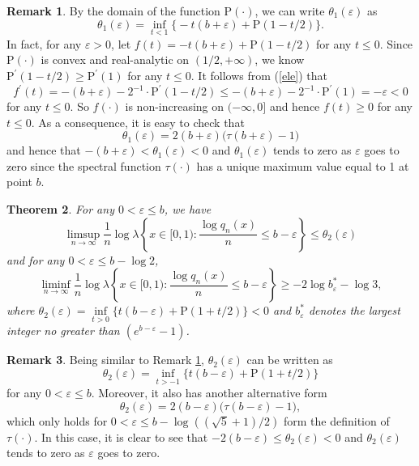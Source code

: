 \documentclass[reqno]{amsart}
\newtheorem{theorem}{Theorem}[section]
\theoremstyle{definition}
\newtheorem{remark}[theorem]{Remark}
\numberwithin{equation}{section}
\begin{document}
\begin{remark}\label{1}
By the domain of the function $\mathrm{P (\cdot)}$, we can write $\theta_1(\varepsilon)$ as
\[
\theta_1(\varepsilon) = \inf\limits_{t < 1} \big\{-t(b + \varepsilon) + \mathrm{P}(1-t/2)\big\}.
\]
In fact, for any $\varepsilon >0$, let $f(t) = -t(b + \varepsilon) + \mathrm{P}(1-t/2)$ for any $t \leq 0$. Since $\mathrm{P(\cdot)}$ is convex and real-analytic on $(1/2,+\infty)$, we know $\mathrm{P}^\prime(1-t/2) \geq \mathrm{P}^\prime(1)$ for any $t \leq 0$. It follows from (\ref{ele}) that
\[
f^\prime(t) = -(b+\varepsilon) -2^{-1}\cdot \mathrm{P}^\prime(1-t/2) \leq -(b+\varepsilon) -2^{-1}\cdot \mathrm{P}^\prime(1) = -\varepsilon <0
\]
for any $t \leq 0$. So $f(\cdot)$ is non-increasing on $(-\infty,0]$ and hence $f(t) \geq 0$ for any $t \leq 0$. As a consequence, it is easy to check that
\[
\theta_1(\varepsilon) = 2(b+\varepsilon)\big(\tau(b+\varepsilon)-1\big)
\]
and hence that $-(b+\varepsilon) < \theta_1(\varepsilon)<0$ and $\theta_1(\varepsilon)$ tends to zero as $\varepsilon$ goes to zero since the spectral function $\tau(\cdot)$ has a unique maximum value equal to 1 at point $b$.
\end{remark}

\begin{theorem}\label{xiaoyu}
For any $0< \varepsilon \leq b$, we have
\begin{equation*}
\limsup_{n \to \infty} \frac{1}{n}\log \lambda\left\{x\in [0,1):\frac{\log q_n(x)}{n} \leq b -\varepsilon\right\} \leq \theta_2(\varepsilon)
\end{equation*}
and for any $0< \varepsilon \leq b - \log 2$,
\begin{equation*}
\liminf_{n \to \infty} \frac{1}{n}\log \lambda\left\{x\in [0,1):\frac{\log q_n(x)}{n} \leq b -\varepsilon\right\} \geq -2\log b^{\ast}_\varepsilon - \log 3,
\end{equation*}
where $\theta_2(\varepsilon) = \inf\limits_{t> 0} \big\{t(b - \varepsilon) + \mathrm{P}(1+t/2)\big\}< 0$ and $b^{\ast}_\varepsilon$ denotes the largest integer no greater than $(e^{b-\varepsilon}-1)$.
\end{theorem}

\begin{remark}\label{2}
Being similar to Remark \ref{1}, $\theta_2(\varepsilon)$ can be written as
\[
\theta_2(\varepsilon) = \inf\limits_{t >- 1} \big\{t(b - \varepsilon) + \mathrm{P}(1+t/2)\big\}
\]
for any $0 < \varepsilon \leq b$. Moreover, it also has another alternative form
\[
\theta_2(\varepsilon) = 2(b-\varepsilon)\big(\tau(b-\varepsilon)-1\big),
\]
which only holds for $0 <\varepsilon \leq b - \log((\sqrt{5}+1)/2)$ form the definition of $\tau(\cdot)$. In this case, it is clear to see that $-2(b-\varepsilon) \leq \theta_2(\varepsilon) <0$ and $\theta_2(\varepsilon)$ tends to zero as $\varepsilon$ goes to zero.
\end{remark}
\end{document}
